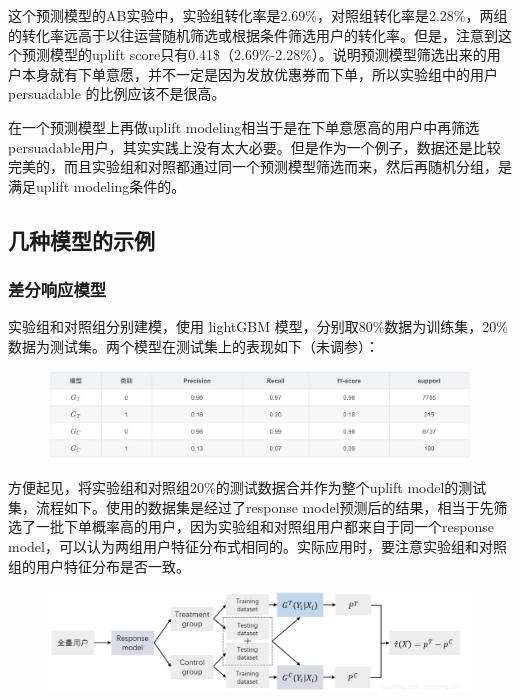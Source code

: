\documentclass[12pt]{article}
\begin{document}
这个预测模型的AB实验中，实验组转化率是2.69\%，对照组转化率是2.28\%，两组的转化率远高于以往运营随机筛选或根据条件筛选用户的转化率。但是，注意到这个预测模型的uplift score只有0.41\$（2.69\%-2.28\%）。说明预测模型筛选出来的用户本身就有下单意愿，并不一定是因为发放优惠券而下单，所以实验组中的用户 persuadable 的比例应该不是很高。

在一个预测模型上再做uplift modeling相当于是在下单意愿高的用户中再筛选persuadable用户，其实实践上没有太大必要。但是作为一个例子，数据还是比较完美的，而且实验组和对照都通过同一个预测模型筛选而来，然后再随机分组，是满足uplift modeling条件的。

\subsection{几种模型的示例}
\subsubsection{差分响应模型}
实验组和对照组分别建模，使用 lightGBM 模型，分别取80\%数据为训练集，20\%数据为测试集。两个模型在测试集上的表现如下（未调参）：
\begin{figure}[H]
    \centering
    \includegraphics[width=1\textwidth]{fig/CasualInference-Uplift_Model_Demo_Table.png}
\end{figure}

方便起见，将实验组和对照组20\%的测试数据合并作为整个uplift model的测试集，流程如下。使用的数据集是经过了response model预测后的结果，相当于先筛选了一批下单概率高的用户，因为实验组和对照组用户都来自于同一个response model，可以认为两组用户特征分布式相同的。实际应用时，要注意实验组和对照组的用户特征分布是否一致。
\begin{figure}[H]
    \centering
    \includegraphics[width=1\textwidth]{fig/CasualInference-Uplift_Model_Demo2.png}
\end{figure}
\end{document}

